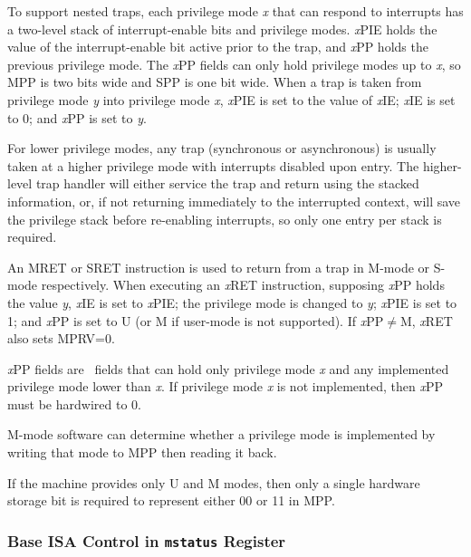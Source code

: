 To support nested traps, each privilege mode {\em x} that can respond to
interrupts has a two-level
stack of interrupt-enable bits and privilege modes.  {\em x}\/PIE
holds the value of the interrupt-enable bit active prior to the trap,
and {\em x}\/PP holds the previous privilege mode.  The {\em x}\/PP
fields can only hold privilege modes up to {\em x}, so MPP is
two bits wide and SPP is one bit wide.  When
a trap is taken from privilege mode {\em y} into privilege mode {\em
  x}, {\em x}\/PIE is set to the value of {\em x}\/IE; {\em x}\/IE is set to
0; and {\em x}\/PP is set to {\em y}.

\begin{commentary}
For lower privilege modes, any trap (synchronous or asynchronous) is
usually taken at a higher privilege mode with interrupts disabled upon entry.
The higher-level trap handler will either service the trap and return
using the stacked information, or, if not returning immediately to the
interrupted context, will save the privilege stack before re-enabling
interrupts, so only one entry per stack is required.
\end{commentary}

An MRET or SRET instruction is used to return from
a trap in M-mode or S-mode respectively.  When
executing an {\em x}\/RET instruction, supposing {\em x}\/PP holds the
value {\em y}, {\em x}\/IE is set to {\em x}\/PIE; the privilege mode
is changed to {\em y}; {\em x}\/PIE is set to 1; and {\em x}\/PP is
set to U (or M if user-mode is not supported).
If {\em x}\/PP$\neq$M, {\em x}\/RET also sets MPRV=0.

{\em x}\/PP fields are \warl\ fields that can hold only privilege mode {\em x}
and any implemented privilege mode lower than {\em x}.  If privilege mode {\em
x} is not implemented, then {\em x}\/PP must be hardwired to 0.

\begin{commentary}
M-mode software can determine whether a privilege mode is implemented
by writing that mode to MPP then reading it back.

If the machine provides only U and M modes, then only a single
hardware storage bit is required to represent either 00 or 11 in MPP.
\end{commentary}

\subsubsection{Base ISA Control in {\tt mstatus} Register}
\label{xlen-control}

